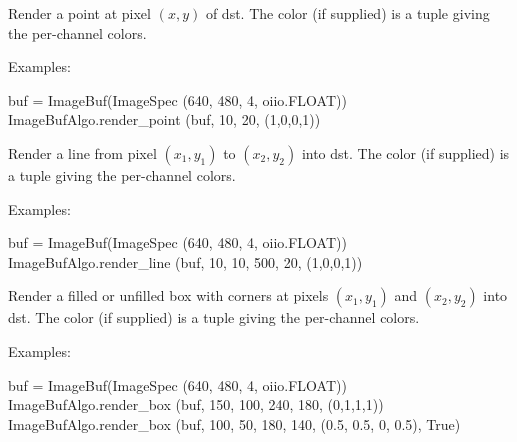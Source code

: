  

Render a point at pixel $(x,y)$ of {\cf dst}.  The {\cf color} (if supplied)
is a tuple giving the per-channel colors.

\smallskip
\noindent Examples:
\begin{code}
    buf = ImageBuf(ImageSpec (640, 480, 4, oiio.FLOAT))
    ImageBufAlgo.render_point (buf, 10, 20, (1,0,0,1))
\end{code}
\apiend


 

Render a line from pixel $(x_1,y_1)$ to $(x_2,y_2)$ into {\cf dst}.  The
{\cf color} (if supplied) is a tuple giving the per-channel colors.

\smallskip
\noindent Examples:
\begin{code}
    buf = ImageBuf(ImageSpec (640, 480, 4, oiio.FLOAT))
    ImageBufAlgo.render_line (buf, 10, 10, 500, 20, (1,0,0,1))
\end{code}
\apiend


 

Render a filled or unfilled box with corners at pixels $(x_1,y_1)$ and
$(x_2,y_2)$ into {\cf dst}.  The {\cf color} (if supplied) is a tuple giving
the per-channel colors.

\smallskip
\noindent Examples:
\begin{code}
    buf = ImageBuf(ImageSpec (640, 480, 4, oiio.FLOAT))
    ImageBufAlgo.render_box (buf, 150, 100, 240, 180, (0,1,1,1))
    ImageBufAlgo.render_box (buf, 100, 50, 180, 140, (0.5, 0.5, 0, 0.5), True)
\end{code}
\apiend


 

